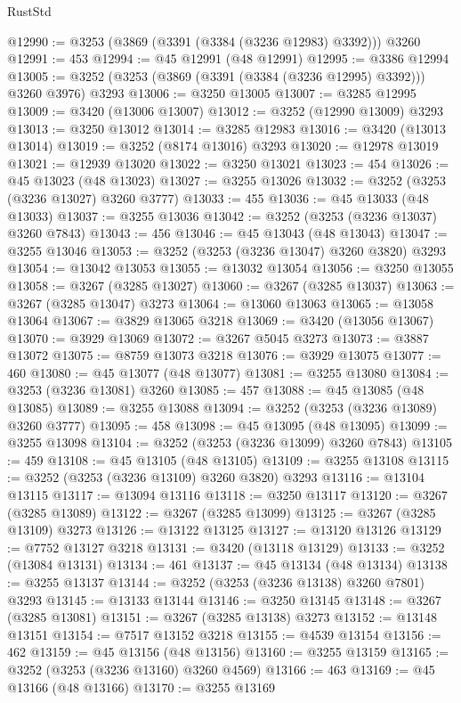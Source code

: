 \begin{lexlean}{RustStd}
\begin{coremodule}
@12990 := @3253 (@3869 (@3391 (@3384 (@3236 @12983) @3392))) @3260
@12991 := 453
@12994 := @45 @12991 (@48 @12991)
@12995 := @3386 @12994
@13005 := @3252 (@3253 (@3869 (@3391 (@3384 (@3236 @12995) @3392))) @3260 @3976) @3293
@13006 := @3250 @13005
@13007 := @3285 @12995
@13009 := @3420 (@13006 @13007)
@13012 := @3252 (@12990 @13009) @3293
@13013 := @3250 @13012
@13014 := @3285 @12983
@13016 := @3420 (@13013 @13014)
@13019 := @3252 (@8174 @13016) @3293
@13020 := @12978 @13019
@13021 := @12939 @13020
@13022 := @3250 @13021
@13023 := 454
@13026 := @45 @13023 (@48 @13023)
@13027 := @3255 @13026
@13032 := @3252 (@3253 (@3236 @13027) @3260 @3777)
@13033 := 455
@13036 := @45 @13033 (@48 @13033)
@13037 := @3255 @13036
@13042 := @3252 (@3253 (@3236 @13037) @3260 @7843)
@13043 := 456
@13046 := @45 @13043 (@48 @13043)
@13047 := @3255 @13046
@13053 := @3252 (@3253 (@3236 @13047) @3260 @3820) @3293
@13054 := @13042 @13053
@13055 := @13032 @13054
@13056 := @3250 @13055
@13058 := @3267 (@3285 @13027)
@13060 := @3267 (@3285 @13037)
@13063 := @3267 (@3285 @13047) @3273
@13064 := @13060 @13063
@13065 := @13058 @13064
@13067 := @3829 @13065 @3218
@13069 := @3420 (@13056 @13067)
@13070 := @3929 @13069
@13072 := @3267 @5045 @3273
@13073 := @3887 @13072
@13075 := @8759 @13073 @3218
@13076 := @3929 @13075
@13077 := 460
@13080 := @45 @13077 (@48 @13077)
@13081 := @3255 @13080
@13084 := @3253 (@3236 @13081) @3260
@13085 := 457
@13088 := @45 @13085 (@48 @13085)
@13089 := @3255 @13088
@13094 := @3252 (@3253 (@3236 @13089) @3260 @3777)
@13095 := 458
@13098 := @45 @13095 (@48 @13095)
@13099 := @3255 @13098
@13104 := @3252 (@3253 (@3236 @13099) @3260 @7843)
@13105 := 459
@13108 := @45 @13105 (@48 @13105)
@13109 := @3255 @13108
@13115 := @3252 (@3253 (@3236 @13109) @3260 @3820) @3293
@13116 := @13104 @13115
@13117 := @13094 @13116
@13118 := @3250 @13117
@13120 := @3267 (@3285 @13089)
@13122 := @3267 (@3285 @13099)
@13125 := @3267 (@3285 @13109) @3273
@13126 := @13122 @13125
@13127 := @13120 @13126
@13129 := @7752 @13127 @3218
@13131 := @3420 (@13118 @13129)
@13133 := @3252 (@13084 @13131)
@13134 := 461
@13137 := @45 @13134 (@48 @13134)
@13138 := @3255 @13137
@13144 := @3252 (@3253 (@3236 @13138) @3260 @7801) @3293
@13145 := @13133 @13144
@13146 := @3250 @13145
@13148 := @3267 (@3285 @13081)
@13151 := @3267 (@3285 @13138) @3273
@13152 := @13148 @13151
@13154 := @7517 @13152 @3218
@13155 := @4539 @13154
@13156 := 462
@13159 := @45 @13156 (@48 @13156)
@13160 := @3255 @13159
@13165 := @3252 (@3253 (@3236 @13160) @3260 @4569)
@13166 := 463
@13169 := @45 @13166 (@48 @13166)
@13170 := @3255 @13169

\end{coremodule}
\end{lexlean}
